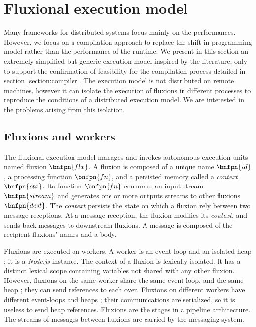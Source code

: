 \section{Fluxional execution model} \label{section:model}

Many frameworks for distributed systems focus mainly on the performances\cite{Akidau2013, Jain2006, Marz2011, Welsh2000, Wu2007, Zaharia2010}.
However, we focus on a compilation approach to replace the shift in programming model rather than the performance of the runtime.
We present in this section an extremely simplified but generic execution model inspired by the literature, only to support the confirmation of feasibility for the compilation process detailed in section \ref{section:compiler}.
The execution model is not distributed on remote machines, however it can isolate the execution of fluxions in different processes to reproduce the conditions of a distributed execution model.
We are interested in the problems arising from this isolation.

\subsection{Fluxions and workers}

The fluxional execution model manages and invokes autonomous execution units named fluxion $\bnfpn{flx}$.
A fluxion is composed of a unique name $\bnfpn{id}$, a processing function $\bnfpn{fn}$, and a persisted memory called a \textit{context} $\bnfpn{ctx}$.
Its function $\bnfpn{fn}$ consumes an input stream $\bnfpn{stream}$ and generates one or more outputs streams to other fluxions $\bnfpn{dest}$.
The \textit{context} persists the state on which a fluxion rely between two message receptions.
At a message reception, the fluxion modifies its \textit{context}, and sends back messages to downstream fluxions.
A message is composed of the recipient fluxions' names and a body.

Fluxions are executed on workers.
A worker is an event-loop and an isolated heap ; it is a \textit{Node.js} instance.
The context of a fluxion is lexically isolated.
It has a distinct lexical scope containing variables not shared with any other fluxion.
However, fluxions on the same worker share the same event-loop, and the same heap ; they can send references to each over.
Fluxions on different workers have different event-loops and heaps ; their communications are serialized, so it is useless to send heap references.
Fluxions are the stages in a pipeline architecture.
The streams of messages between fluxions are carried by the messaging system.

